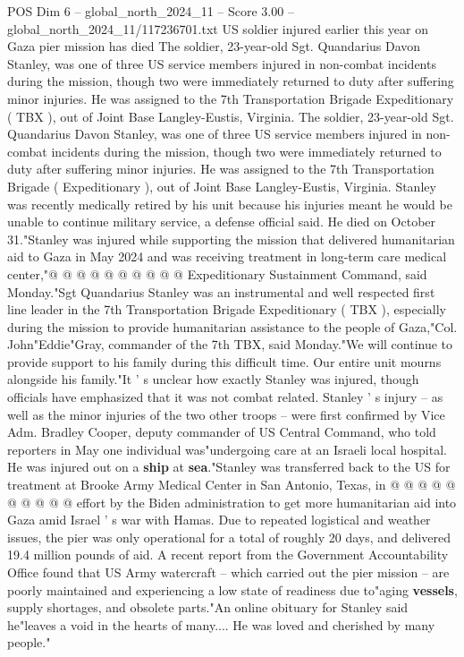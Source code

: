 \begin{textsample}{POS Dim 6 – global\_north\_2024\_11 – Score 3.00 – global\_north\_2024\_11/117236701.txt}  \label{ex:f6_pos_356}
US soldier injured earlier this year on Gaza pier mission has died The soldier, 23-year-old Sgt.
Quandarius Davon Stanley, was one of three US service members injured in non-combat incidents during the mission, though two were immediately returned to duty after suffering minor injuries.
He was assigned to the 7th Transportation Brigade Expeditionary ( TBX ), out of Joint Base Langley-Eustis, Virginia.
The soldier, 23-year-old Sgt.
Quandarius Davon Stanley, was one of three US service members injured in non-combat incidents during the mission, though two were immediately returned to duty after suffering minor injuries.
He was assigned to the 7th Transportation Brigade ( Expeditionary ), out of Joint Base Langley-Eustis, Virginia.
Stanley was recently medically retired by his unit because his injuries meant he would be unable to continue military service, a defense official said.
He died on October 31."Stanley was injured while supporting the mission that delivered humanitarian aid to Gaza in May 2024 and was receiving treatment in long-term care medical center,"@ @ @ @ @ @ @ @ @ @ Expeditionary Sustainment Command, said Monday."Sgt Quandarius Stanley was an instrumental and well respected first line leader in the 7th Transportation Brigade Expeditionary ( TBX ), especially during the mission to provide humanitarian assistance to the people of Gaza,"Col.
John"Eddie"Gray, commander of the 7th TBX, said Monday."We will continue to provide support to his family during this difficult time.
Our entire unit mourns alongside his family."It ' s unclear how exactly Stanley was injured, though officials have emphasized that it was not combat related.
Stanley ' s injury -- as well as the minor injuries of the two other troops -- were first confirmed by Vice Adm.
Bradley Cooper, deputy commander of US Central Command, who told reporters in May one individual was"undergoing care at an Israeli local hospital.
He was injured out on a \textbf{ship} at \textbf{sea}."Stanley was transferred back to the US for treatment at Brooke Army Medical Center in San Antonio, Texas, in @ @ @ @ @ @ @ @ @ @ effort by the Biden administration to get more humanitarian aid into Gaza amid Israel ' s war with Hamas.
Due to repeated logistical and weather issues, the pier was only operational for a total of roughly 20 days, and delivered 19.4 million pounds of aid.
A recent report from the Government Accountability Office found that US Army watercraft -- which carried out the pier mission -- are poorly maintained and experiencing a low state of readiness due to"aging \textbf{vessels}, supply shortages, and obsolete parts."An online obituary for Stanley said he"leaves a void in the hearts of many....
He was loved and cherished by many people."

\end{textsample}
